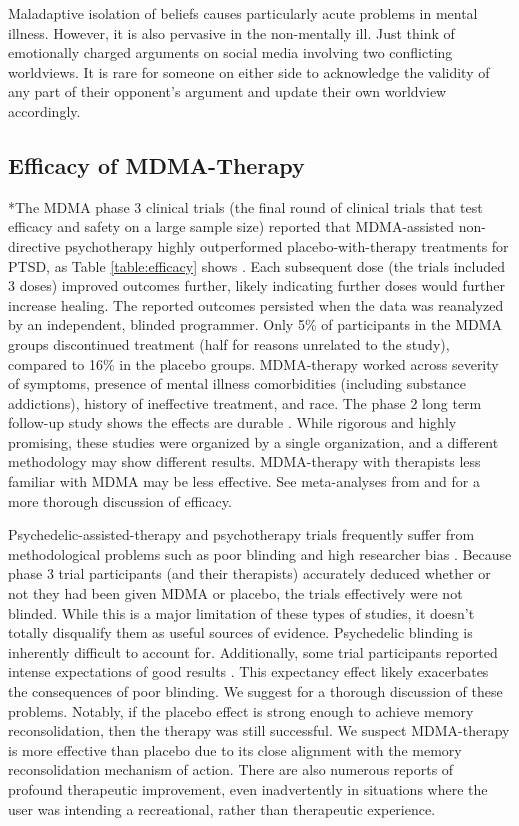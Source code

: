 \documentclass[12pt,letterpaper]{article}
\begin{document}
Maladaptive isolation of beliefs causes particularly acute problems in mental illness. However, it is also pervasive in the non-mentally ill. Just think of emotionally charged arguments on social media involving two conflicting worldviews. It is rare for someone on either side to acknowledge the validity of any part of their opponent's argument and update their own worldview accordingly.

\subsection{Efficacy of MDMA-Therapy}
*The MDMA phase 3 clinical trials (the final round of clinical trials that test efficacy and safety on a large sample size) reported that MDMA-assisted non-directive psychotherapy highly outperformed placebo-with-therapy treatments for PTSD, as Table \ref{table:efficacy} shows \cite{mitchellMDMAClinicalTrial,mitchellMDMAClinicalTrial2}. Each subsequent dose (the trials included 3 doses) improved outcomes further, likely indicating further doses would further increase healing. The reported outcomes persisted when the data was reanalyzed by an independent, blinded programmer. Only 5\% of participants in the MDMA groups discontinued treatment (half for reasons unrelated to the study), compared to 16\% in the placebo groups. MDMA-therapy worked across severity of symptoms, presence of mental illness comorbidities (including substance addictions), history of ineffective treatment, and race. The phase 2 long term follow-up study shows the effects are durable \cite{jeromeMDMALongTerm}. While rigorous and highly promising, these studies were organized by a single organization, and a different methodology may show different results. MDMA-therapy with therapists less familiar with MDMA may be less effective. See meta-analyses from \textcite{greenMeta} and \textcite{smithSystematic} for a more thorough discussion of efficacy.

Psychedelic-assisted-therapy and psychotherapy trials frequently suffer from methodological problems such as poor blinding and high researcher bias \cite{adayMethodologicalRigor}. Because phase 3 trial participants (and their therapists) accurately deduced whether or not they had been given MDMA or placebo, the trials effectively were not blinded. While this is a major limitation of these types of studies, it doesn't totally disqualify them as useful sources of evidence. Psychedelic blinding is inherently difficult to account for. Additionally, some trial participants reported intense expectations of good results \cite{powerTrip}. This expectancy effect likely exacerbates the consequences of poor blinding. We suggest \textcite{vanElkMethodology} for a thorough discussion of these problems. Notably, if the placebo effect is strong enough to achieve memory reconsolidation, then the therapy was still successful. We suspect MDMA-therapy is more effective than placebo due to its close alignment with the memory reconsolidation mechanism of action. There are also numerous reports of profound therapeutic improvement, even inadvertently in situations where the user was intending a recreational, rather than therapeutic experience.
\end{document}
